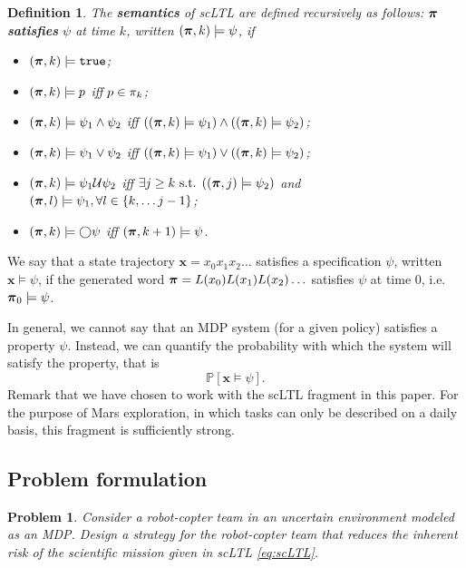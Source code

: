 \documentclass[conference]{IEEEtran}
\newtheorem{problem}{Problem}
\newtheorem{definition}{Definition}
\newcommand{\sofieNew}[1]{{\color{blue}#1}}
\begin{document}
\begin{definition}
 The \textbf{semantics} of scLTL are defined recursively as follows: $\boldsymbol{\pi}$ \textbf{satisfies} $\psi$ at time $k$, written $(\boldsymbol{\pi}, k) \models \psi$, if
 \begin{itemize}
    \item $(\boldsymbol{\pi}, k) \models \texttt{true}$;
    \item $(\boldsymbol{\pi}, k) \models p$ iff $p \in \pi_k$;
    \item $(\boldsymbol{\pi}, k) \models \psi_1 \land  \psi_2  $ iff $ ( (\boldsymbol{\pi}, k) \models \psi_1 ) \land ( (\boldsymbol{\pi}, k) \models \psi_2 ) $;
    \item $(\boldsymbol{\pi}, k) \models \psi_1 \lor  \psi_2  $ iff $ ( (\boldsymbol{\pi}, k) \models \psi_1 ) \lor ( (\boldsymbol{\pi}, k) \models \psi_2 ) $;
    \item $(\boldsymbol{\pi}, k) \models  \psi_1 \mathcal{U} \psi_2 $ iff $\exists j \geq k \text{ s.t. } ((\boldsymbol{\pi}, j) \models \psi_2 ) $ and $(\boldsymbol{\pi}, l) \models \psi_1, \forall l \in \{k, \ldots j-1\}$;
    \item $(\boldsymbol{\pi}, k) \models \bigcirc \psi$ iff $(\boldsymbol{\pi}, k+1) \models \psi$.
 \end{itemize}

\end{definition}
We say that a state trajectory $\mathbf{x} = x_0 x_1 x_2 \ldots$ satisfies a specification $\psi$, written $\mathbf{x} \models \psi$, if the generated word $\boldsymbol{\pi} =L(x_0) L(x_1) L(x_2) \ldots$ satisfies $\psi$ at time 0, i.e. $\boldsymbol{\pi}_0 \models \psi$.

\sofieNew{In general, we cannot say that an MDP system (for a given policy) satisfies a property $\psi$. Instead, we can quantify the probability with which the system will satisfy the property, that is  \begin{equation}\label{eq:probLTL}\mathbb P[\mathbf x \vDash \psi ] .\end{equation}
}
\sofieNew{Remark that we have chosen to work with the scLTL fragment in this paper.  For the purpose of Mars exploration, in which tasks can only be described on a daily basis, this fragment is sufficiently strong.}



\subsection{Problem formulation}

\begin{problem}
\label{prob:main}
Consider a robot-copter team in an uncertain environment modeled as an MDP.  Design a strategy for the robot-copter team that reduces the inherent risk of the scientific mission given in scLTL \eqref{eq:scLTL}.
\end{problem}
\end{document}
